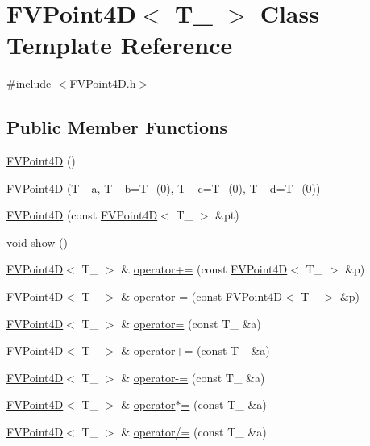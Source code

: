 \hypertarget{classFVPoint4D}{
\section{FVPoint4D$<$ T\_\- $>$ Class Template Reference}
\label{d1/de0/classFVPoint4D}
}


{\ttfamily \#include $<$FVPoint4D.h$>$}

\subsection*{Public Member Functions}
\begin{DoxyCompactItemize}
\item 
\hyperlink{classFVPoint4D_a42e157c6ad8d923992b7fa6008c13a14}{FVPoint4D} ()
\item 
\hyperlink{classFVPoint4D_a53dcd81a22357f031f187ee4c725b8f8}{FVPoint4D} (T\_\- a, T\_\- b=T\_\-(0), T\_\- c=T\_\-(0), T\_\- d=T\_\-(0))
\item 
\hyperlink{classFVPoint4D_a6e721d9d984e2a6126f0fade06e4c8b1}{FVPoint4D} (const \hyperlink{classFVPoint4D}{FVPoint4D}$<$ T\_\- $>$ \&pt)
\item 
void \hyperlink{classFVPoint4D_a4b148f40a95444d5669406b918ad2f52}{show} ()
\item 
\hyperlink{classFVPoint4D}{FVPoint4D}$<$ T\_\- $>$ \& \hyperlink{classFVPoint4D_a2450dfcb7e8a651d83418b9a937e66f0}{operator+=} (const \hyperlink{classFVPoint4D}{FVPoint4D}$<$ T\_\- $>$ \&p)
\item 
\hyperlink{classFVPoint4D}{FVPoint4D}$<$ T\_\- $>$ \& \hyperlink{classFVPoint4D_af6b522a830b27c895ab0b29f40bfb8be}{operator-\/=} (const \hyperlink{classFVPoint4D}{FVPoint4D}$<$ T\_\- $>$ \&p)
\item 
\hyperlink{classFVPoint4D}{FVPoint4D}$<$ T\_\- $>$ \& \hyperlink{classFVPoint4D_aa6b4afc70c5680be22631f43a4ce51fa}{operator=} (const T\_\- \&a)
\item 
\hyperlink{classFVPoint4D}{FVPoint4D}$<$ T\_\- $>$ \& \hyperlink{classFVPoint4D_a5a93a456e219325d90d16f1bba4e2fae}{operator+=} (const T\_\- \&a)
\item 
\hyperlink{classFVPoint4D}{FVPoint4D}$<$ T\_\- $>$ \& \hyperlink{classFVPoint4D_ae1c938ce9d4d2cbba549cd08a76a8407}{operator-\/=} (const T\_\- \&a)
\item 
\hyperlink{classFVPoint4D}{FVPoint4D}$<$ T\_\- $>$ \& \hyperlink{classFVPoint4D_a065108f237b6bb9c0f86873d616913c7}{operator$\ast$=} (const T\_\- \&a)
\item 
\hyperlink{classFVPoint4D}{FVPoint4D}$<$ T\_\- $>$ \& \hyperlink{classFVPoint4D_ad0daff37afd4833c6a1bf4c6fcbe831f}{operator/=} (const T\_\- \&a)
\end{DoxyCompactItemize}
